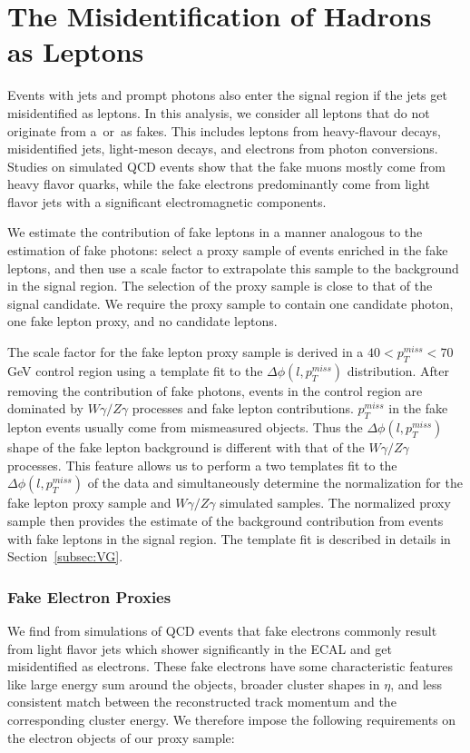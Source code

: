 \documentclass[thesis.tex]{subfiles}
\renewcommand\_{\textunderscore\allowbreak}
\begin{document}
\section{The Misidentification of Hadrons as Leptons}
\label{subsec:jetfakelep}

Events with jets and prompt photons also enter the signal region if the jets get misidentified as leptons. In this analysis,  we consider all leptons that do not originate  from a~\PWpm or~\PZz as  fakes. This includes leptons from heavy-flavour decays, misidentified jets, light-meson decays, and electrons from photon conversions. Studies on simulated QCD events show that the fake muons mostly come from  heavy flavor quarks, while the fake electrons predominantly come from light flavor jets with a significant electromagnetic components. 

We estimate the contribution of fake leptons in a manner analogous to the
estimation of fake photons: select a proxy sample of events enriched in the fake leptons, and then use a scale factor to extrapolate this sample to the background in the signal region.  The selection of the proxy sample is close to that of the signal candidate. We require the proxy sample to contain one candidate photon, one fake lepton proxy, and no candidate leptons. 

The scale factor for the fake lepton proxy sample is derived in a $40 < p_{T}^{miss} < 70$ GeV control region using a template fit to the
$\Delta\phi\left(l, p_{T}^{miss}\right)$ distribution. After removing the contribution of fake photons, events in the control region are dominated by $W\gamma/Z\gamma$ processes and fake lepton contributions. $p_{T}^{miss}$ in the fake lepton events usually come from mismeasured objects. Thus the $\Delta\phi\left(l, p_{T}^{miss}\right)$ shape of the fake lepton background is different with that of the $W\gamma/Z\gamma$ processes. This feature allows us to perform a two templates fit to the $\Delta\phi\left(l, p_{T}^{miss}\right)$ of the data and simultaneously determine the normalization for the fake lepton proxy sample and $W\gamma/Z\gamma$ simulated samples. The normalized proxy sample then provides the estimate of the
background contribution from events with fake leptons in the signal region. The template fit is described in details in Section~\ref{subsec:VG}. 

\subsubsection{Fake Electron Proxies}
We find from simulations of QCD events that fake electrons commonly result from light flavor jets which shower significantly in the ECAL and get misidentified as electrons. These fake electrons have some characteristic features like large energy sum around the objects,  broader cluster shapes in $\eta$, and less consistent match between the reconstructed track momentum and the corresponding cluster energy. We therefore impose the following requirements on the electron objects of our proxy sample:
\end{document}
